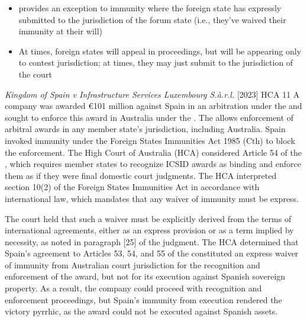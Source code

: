\begin{itemize}
    \item {} provides an exception to immunity where the foreign state has expressly submitted to the jurisdiction of the forum state (i.e., they've waived their immunity at their will)
    \item At times, foreign states will appeal in proceedings, but will be appearing only to contest jurisdiction; at times, they may just submit to the jurisdiction of the court
\end{itemize}

\begin{casedetails}{\textit{Kingdom of Spain v Infrastructure Services Luxembourg S.à.r.l.} [2023] HCA 11}
    \flushleft
    A company was awarded €101 million against Spain in an arbitration under the  and sought to enforce this award in Australia under the . The  allows enforcement of arbitral awards in any member state's jurisdiction, including Australia. Spain invoked immunity under the Foreign States Immunities Act 1985 (Cth) to block the enforcement. The High Court of Australia (HCA) considered Article 54 of the , which requires member states to recognize ICSID awards as binding and enforce them as if they were final domestic court judgments. The HCA interpreted section 10(2) of the Foreign States Immunities Act in accordance with international law, which mandates that any waiver of immunity must be express.
    
    \vspace{\baselineskip}
    
    The court held that such a waiver must be explicitly derived from the terms of international agreements, either as an express provision or as a term implied by necessity, as noted in paragraph [25] of the judgment. The HCA determined that Spain's agreement to Articles 53, 54, and 55 of the  constituted an express waiver of immunity from Australian court jurisdiction for the recognition and enforcement of the award, but not for its execution against Spanish sovereign property. As a result, the company could proceed with recognition and enforcement proceedings, but Spain's immunity from execution rendered the victory pyrrhic, as the award could not be executed against Spanish assets.
\end{casedetails}


